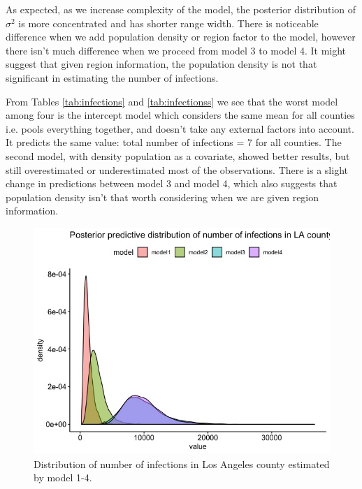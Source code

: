 \documentclass[11pt,twocolumn]{asaproc}
\begin{document}
As expected, as we increase complexity of the model, the posterior distribution of $\sigma^2$ is more concentrated and has shorter range width. There is noticeable difference when we add population density or region factor to the model, however there isn't much difference when we proceed from model 3 to model 4. It might suggest that given region information, the population density is not that significant in estimating the number of infections. 


From Tables \ref{tab:infections} and \ref{tab:infectionss} we see that the worst model among four is the intercept model which considers the same mean for all counties i.e. pools everything together, and doesn't take any external factors into account. It predicts the same value: total number of infections = 7 for all counties. The second model, with density population as a covariate, showed better results, but still overestimated or underestimated most of the observations. There is a slight change in predictions between model 3 and model 4, which also suggests that population density isn't that worth considering when we are given region information. 



\begin{figure}[t]
\centering\includegraphics[scale=.30]{LA.jpeg}
\caption{Distribution of number of infections in Los Angeles county estimated by model 1-4.}
\label{fig:LA}
\end{figure}
\end{document}
